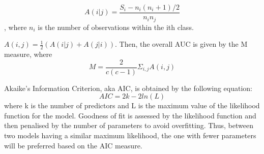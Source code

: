 \[A(i|j)=\frac{S_i-n_i(n_i+1)/2}{n_in_j}
\], where $n_i$ is the number of observations within the ith class.

$A(i,j) = \frac{1}{2}(A(i|j)+A(j|i))$.
Then, the overall AUC is given by the M measure, where \[M=\frac{2}{c(c-1)}\Sigma_{i,j}A(i,j)\]


Akaike's Information Criterion, aka AIC, is obtained by the following equation:
\[AIC = 2k-2ln(L)
\]
where k is the number of predictors and L is the maximum value of the likelihood function for the model. Goodness of fit is assessed by the likelihood function and then penalised by the number of parameters to avoid overfitting. Thus, between two models having a similar maximum likelihood, the one with fewer parameters will be preferred based on the AIC measure.

